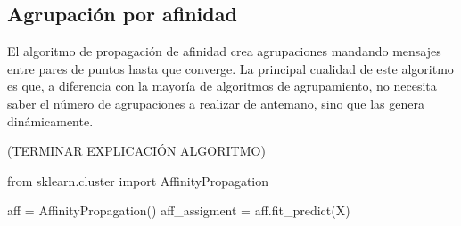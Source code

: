 \newpage
\subsection{Agrupación por afinidad}

El algoritmo de propagación de afinidad crea agrupaciones mandando mensajes entre pares de puntos hasta que converge. La principal cualidad de este algoritmo es que, a diferencia con la mayoría de algoritmos de agrupamiento, no necesita saber el número de agrupaciones a realizar de antemano, sino que las genera dinámicamente.

(TERMINAR EXPLICACIÓN ALGORITMO)

\begin{mypython}[float={h},caption={Propagación de afinidad.}]
  from sklearn.cluster import AffinityPropagation

  aff = AffinityPropagation()
  aff_assigment = aff.fit_predict(X)
\end{mypython}

